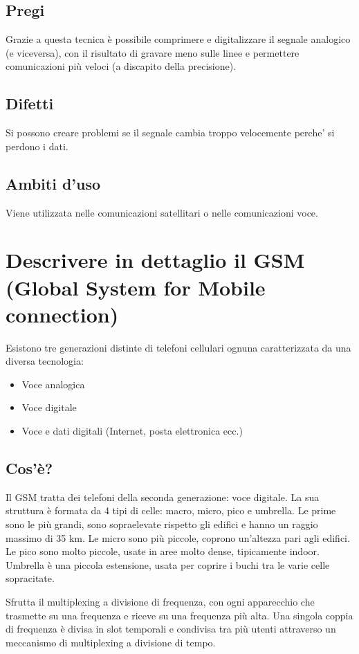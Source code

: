  \subsection{Pregi}
 Grazie a questa tecnica è possibile comprimere e digitalizzare il segnale analogico (e viceversa), con il risultato di gravare meno sulle linee e permettere comunicazioni più veloci (a discapito della precisione).
 \subsection{Difetti}
 Si possono creare problemi se il segnale cambia troppo velocemente perche' si perdono i dati.
 \subsection{Ambiti d'uso}
 Viene utilizzata nelle comunicazioni satellitari o nelle comunicazioni voce.
 
\section{Descrivere in dettaglio il GSM (Global System for Mobile connection)}
Esistono tre generazioni distinte di telefoni cellulari ognuna caratterizzata da una diversa tecnologia:
\begin{itemize}
\item	Voce analogica
\item	Voce digitale
\item	Voce e dati digitali (Internet, posta elettronica ecc.)
\end{itemize}
\subsection{Cos'è?}
Il GSM tratta dei telefoni della seconda generazione: voce digitale.
La sua struttura è formata da 4 tipi di celle: macro, micro, pico e umbrella. 
Le prime sono le più grandi, sono sopraelevate rispetto gli edifici e hanno un raggio massimo di 35 km. Le micro sono più piccole, coprono un'altezza pari agli edifici. Le pico sono molto piccole, usate in aree molto dense, tipicamente indoor. Umbrella è una piccola estensione, usata per coprire i buchi tra le varie celle sopracitate.

Sfrutta il multiplexing a divisione di frequenza, con ogni apparecchio che trasmette su una frequenza e riceve su una frequenza più alta. Una singola coppia di frequenza è divisa in slot temporali e condivisa tra più utenti attraverso un meccanismo di multiplexing a divisione di tempo.

